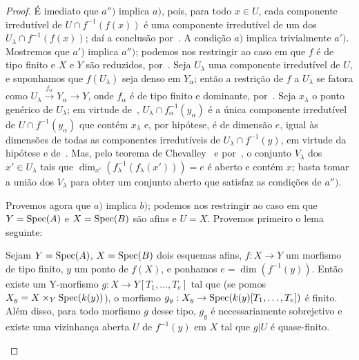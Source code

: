 \begin{proof}
É imediato que $a'')$ implica $a)$, pois, para todo $x\in U$, cada componente
irredutível de $U\cap f^{-1}(f(x))$ é uma componente irredutível de um dos
$U_\lambda\cap f^{-1}(f(x))$; daí a conclusão por~.
A condição $a)$ implica trivialmente $a')$.
Mostremos que $a')$ implica $a'')$; podemos nos restringir ao caso em que
$f$ é de tipo finito e $X$ e $Y$ são reduzidos, por~.
Seja $U_\lambda$ uma componente irredutível de $U$, e suponhamos que
$f(U_\lambda)$ seja denso em $Y_\alpha$; então a restrição de $f$ a
$U_\lambda$ se fatora como
$U_\lambda\xrightarrow{f_\alpha}Y_\alpha\longrightarrow Y$, onde $f_\alpha$
é de tipo finito e dominante, por~.
Seja $x_\lambda$ o ponto genérico de $U_\lambda$; em virtude
de~, $U_\lambda\cap f_\alpha^{-1}(y_\alpha)$ é a única
componente irredutível de $U\cap f^{-1}(y_\alpha)$ que contém $x_\lambda$
e, por hipótese, é de dimensão $e$, igual às dimensões de todas as
componentes irredutíveis de $U_\lambda\cap f^{-1}(y)$, em virtude da
hipótese e de~.
Mas, pelo teorema de Chevalley~ e por~,
o conjunto $V_\lambda$ dos $x'\in U_\lambda$ tais que
$\dim_{x'}(f_\lambda^{-1}(f_\lambda(x')))=e$ é aberto e contém $x$;
basta tomar a união dos $V_\lambda$ para obter um conjunto aberto
que satisfaz as condições de $a'')$.

Provemos agora que $a)$ implica $b)$; podemos nos restringir ao caso em que
$Y=\operatorname{Spec}(A)$ e $X=\operatorname{Spec}(B)$ são afins e $U=X$.
Provemos primeiro o lema seguinte:

\begin{lemma}[13.3.1.1]
\label{IV.13.3.1.1}
Sejam $Y=\operatorname{Spec}(A)$, $X=\operatorname{Spec}(B)$ dois esquemas afins, $f:X\to Y$ um morfismo
de tipo finito, $y$ um ponto de $f(X)$, e ponhamos $e=\dim(f^{-1}(y))$.
Então existe um $\mathrm Y$-morfismo $g:X\to Y[T_1,\ldots,T_e]$ tal que
(se pomos $X_y=X\times_Y\operatorname{Spec}(k(y))$), o morfismo
$g_y:X_y\to\Spec(k(y)[T_1,\ldots,T_e])$ é finito.
Além disso, para todo morfismo $g$ desse tipo, $g_y$ é necessariamente
sobrejetivo e existe uma vizinhança aberta $U$ de $f^{-1}(y)$ em $X$
tal que $g|U$ é quase-finito.
\end{lemma}


\end{proof}
